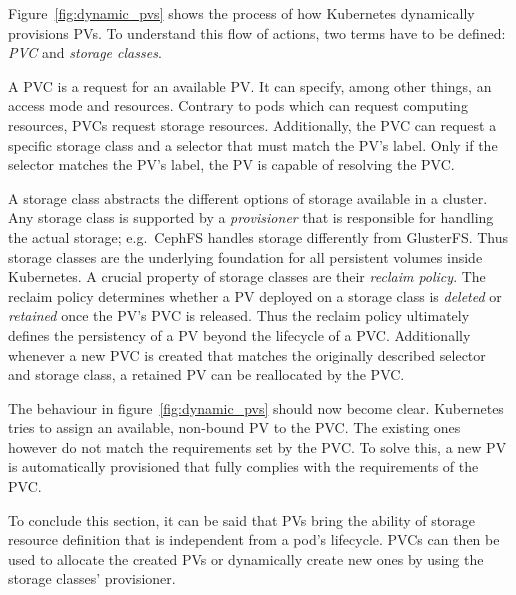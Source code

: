 Figure~\ref{fig:dynamic_pvs} shows the process of how Kubernetes dynamically
provisions \acp{PV}. To understand this flow of actions, two terms have to be
defined: \textit{\acf{PVC}} and \textit{storage classes}. 

A \ac{PVC} is a request for an available \ac{PV}. It can specify, among other
things, an access mode and resources. Contrary to pods which can request
computing resources, \acp{PVC} request storage resources. Additionally, the
\ac{PVC} can request a specific storage class and a selector that must match
the \ac{PV}'s label. Only if the selector matches the \ac{PV}'s label, the
\ac{PV} is capable of resolving the \ac{PVC}.

A storage class abstracts the different options of storage available in a
cluster. Any storage class is supported by a \textit{provisioner} that is
responsible for handling the actual storage; e.g.\ CephFS handles storage
differently from GlusterFS. Thus storage classes are the underlying foundation
for all persistent volumes inside Kubernetes. A crucial property of storage
classes are their \textit{reclaim policy}. The reclaim policy determines
whether a \ac{PV} deployed on a storage class is \textit{deleted} or
\textit{retained} once the \ac{PV}'s \ac{PVC} is released. Thus the reclaim
policy ultimately defines the persistency of a \ac{PV} beyond the lifecycle of
a \ac{PVC}. Additionally whenever a new \ac{PVC} is created that matches the
originally described selector and storage class, a retained \ac{PV} can be
reallocated by the \ac{PVC}.

The behaviour in figure~\ref{fig:dynamic_pvs} should now become clear.
Kubernetes tries to assign an available, non-bound \ac{PV} to the \ac{PVC}.
The existing ones however do not match the requirements set by the \ac{PVC}. To
solve this, a new \ac{PV} is automatically provisioned that fully complies with
the requirements of the \ac{PVC}.

To conclude this section, it can be said that \acp{PV} bring the ability of
storage resource definition that is independent from a pod's lifecycle.
\acp{PVC} can then be used to allocate the created \acp{PV} or dynamically
create new ones by using the storage classes' provisioner.
